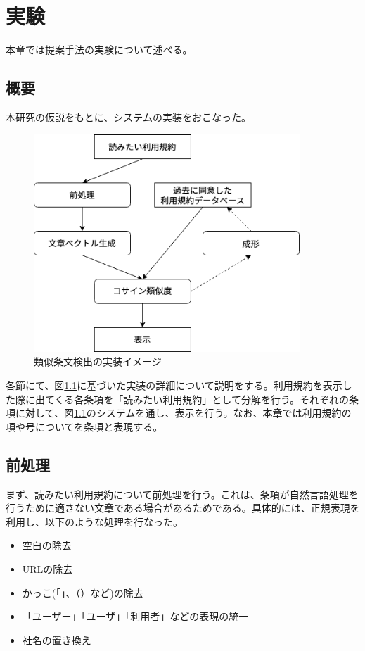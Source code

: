 \chapter{実験}
\label{experiment}

本章では提案手法の実験について述べる。

\section{概要}
\label{sub:実験概要}
本研究の仮説をもとに、システムの実装をおこなった。
\begin{figure}[h]
  \begin{center}
      \includegraphics[width=10cm]{img/system.drawio.png}
      \caption{類似条文検出の実装イメージ}
      \label{img:類似条文検出の実装イメージ}
  \end{center}
\end{figure}

各節にて、図\ref{img:類似条文検出の実装イメージ}に基づいた実装の詳細について説明をする。利用規約を表示した際に出てくる各条項を「読みたい利用規約」として分解を行う。それぞれの条項に対して、図\ref{img:類似条文検出の実装イメージ}のシステムを通し、表示を行う。なお、本章では利用規約の項や号についてを条項と表現する。

\section{前処理}
\label{sec:前処理}
まず、読みたい利用規約について前処理を行う。これは、条項が自然言語処理を行うために適さない文章である場合があるためである。具体的には、正規表現を利用し、以下のような処理を行なった。

\begin{itemize}
  \item 空白の除去
  \item URLの除去
  \item かっこ(「」、（）など)の除去
  \item 「ユーザー」「ユーザ」「利用者」などの表現の統一
  \item 社名の置き換え
\end{itemize}


